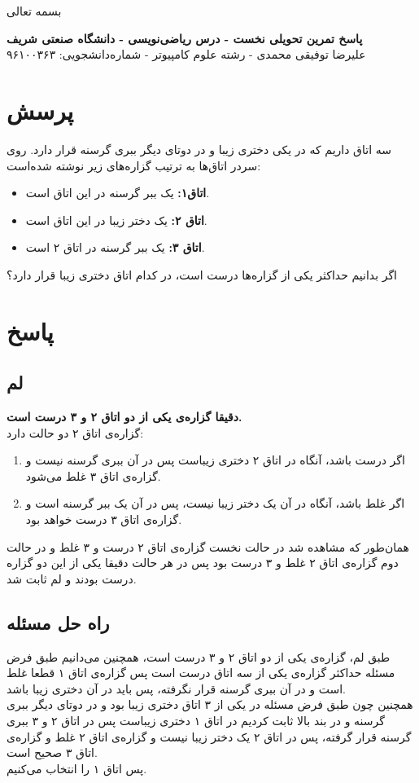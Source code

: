\documentclass[12pt,a4paper]{article}
\begin{document}
\begin{center}
	بسمه تعالی
\end{center}
\begin{center}
	\textbf{پاسخ تمرین تحویلی نخست - درس ریاضی‌نویسی - دانشگاه صنعتی شریف}
	\\
	علیرضا توفیقی محمدی - رشته علوم کامپیوتر - شماره‌دانشجویی: ۹۶۱۰۰۳۶۳
\end{center}
\section*{پرسش}
سه اتاق داریم که در یکی دختری زیبا و در دوتای دیگر ببری گرسنه قرار دارد. روی سردر اتاق‌ها به ترتیب گزاره‌های زیر نوشته شده‌است:
\begin{itemize}
	\item \textbf{اتاق۱:}
		یک ببر گرسنه در این اتاق است.
	\item \textbf{اتاق ۲:}
	یک دختر زیبا در این اتاق است.
	\item \textbf{اتاق ۳:}
	یک ببر گرسنه در اتاق ۲ است.
\end{itemize}
اگر بدانیم حداکثر یکی از گزاره‌ها درست است، در کدام اتاق دختری زیبا قرار دارد؟
\section*{پاسخ}
\subsection*{لم}
\textbf{دقیقا گزاره‌ی یکی از دو اتاق ۲ و ۳ درست است.}
\\
گزاره‌ی اتاق ۲ دو حالت دارد:
\begin{enumerate}
\item
اگر درست باشد، آنگاه در اتاق ۲ دختری زیبا‌ست پس در آن ببری گرسنه نیست و گزاره‌ی اتاق ۳ غلط می‌شود.
\item
اگر غلط باشد، آنگاه در آن یک دختر زیبا نیست، پس در آن یک ببر گرسنه است و گزاره‌ی اتاق ۳ درست خواهد بود.
\end{enumerate}
همان‌طور که مشاهده شد در حالت نخست گزاره‌ی اتاق ۲ درست و ۳ غلط و در حالت دوم گزاره‌ی اتاق ۲ غلط و ۳ درست بود پس در هر حالت دقیقا یکی از این دو گزاره درست بودند و لم ثابت شد.
\subsection*{راه حل مسئله}
طبق لم، گزاره‌ی یکی از دو اتاق ۲ و ۳ درست است، همچنین می‌دانیم طبق فرض مسئله حداکثر گزاره‌ی یکی از سه اتاق درست است پس گزاره‌ی اتاق ۱ قطعا غلط است و در آن ببری گرسنه قرار نگرفته، پس باید در آن دختری زیبا باشد.
\\
همچنین چون طبق فرض مسئله در یکی از ۳ اتاق دختری زیبا بود و در دوتای دیگر ببری گرسنه و در بند بالا ثابت کردیم در اتاق ۱ دختری زیباست پس در اتاق ۲ و ۳ ببری گرسنه قرار گرفته، پس در اتاق ۲ یک دختر زیبا نیست و گزاره‌ی اتاق ۲ غلط و گزاره‌ی اتاق ۳ صحیح است.
\\
پس اتاق ۱ را انتخاب می‌کنیم.
\end{document}
